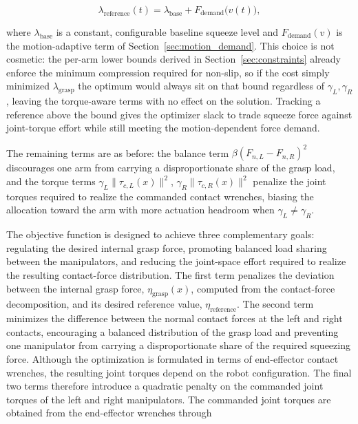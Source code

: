 \documentclass[conference]{IEEEtran}
\begin{document}
\begin{equation}
\lambda_{\mathrm{reference}}(t) = \lambda_{\mathrm{base}} + F_{\mathrm{demand}}\big(v(t)\big),
\label{eq:lambda_ref}
\end{equation}

where $\lambda_{\mathrm{base}}$ is a constant, configurable baseline squeeze level and $F_{\mathrm{demand}}(v)$ is the motion-adaptive term of Section~\ref{sec:motion_demand}. This choice is not cosmetic: the per-arm lower bounds derived in Section~\ref{sec:constraints} already enforce the minimum compression required for non-slip, so if the cost simply minimized $\lambda_{\mathrm{grasp}}$ the optimum would always sit on that bound regardless of $\gamma_L,\gamma_R$, leaving the torque-aware terms with no effect on the solution. Tracking a reference above the bound gives the optimizer slack to trade squeeze force against joint-torque effort while still meeting the motion-dependent force demand.

The remaining terms are as before: the balance term $\beta(F_{n,L}-F_{n,R})^2$ discourages one arm from carrying a disproportionate share of the grasp load, and the torque terms $\gamma_L\lVert\tau_{c,L}(x)\rVert^2$, $\gamma_R\lVert\tau_{c,R}(x)\rVert^2$ penalize the joint torques required to realize the commanded contact wrenches, biasing the allocation toward the arm with more actuation headroom when $\gamma_L\neq\gamma_R$.

The objective function is designed to achieve three complementary goals: regulating the desired internal grasp force, promoting balanced load sharing between the manipulators, and reducing the joint-space effort required to realize the resulting contact-force distribution. 
The first term penalizes the deviation between the internal grasp force, $\eta_{\mathrm{grasp}}(x)$, computed from the contact-force decomposition, and its desired reference value, $\eta_{\mathrm{reference}}$. 
The second term minimizes the difference between the normal contact forces at the left and right contacts, encouraging a balanced distribution of the grasp load and preventing one manipulator from carrying a disproportionate share of the required squeezing force.
Although the optimization is formulated in terms of end-effector contact wrenches, the resulting joint torques depend on the robot configuration. The final two terms therefore introduce a quadratic penalty on the commanded joint torques of the left and right manipulators. The commanded joint torques are obtained from the end-effector wrenches through
\end{document}

